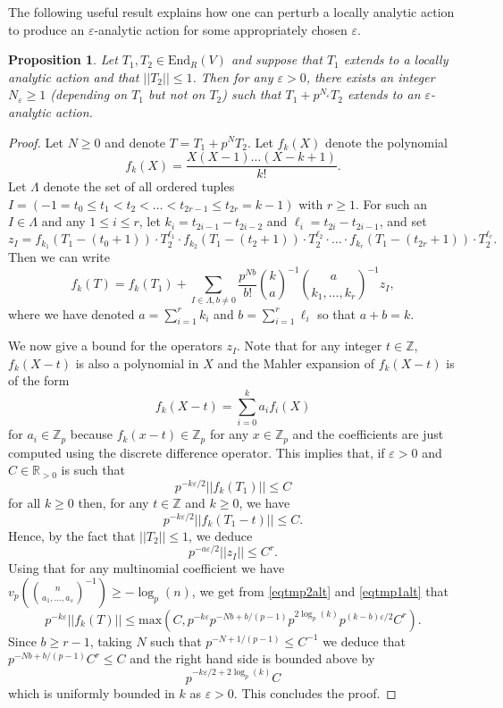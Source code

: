 \documentclass[10pt, oneside]{amsart}
\numberwithin{equation}{subsection}
\newtheorem{proposition}[equation]{Proposition}
\theoremstyle{definition}
\theoremstyle{remark}
\newcommand{\mbb}[1]{\mathbb{#1}}
\def\Z{{\mathbb{Z}}}
\def\zp{{\Z_p}}
\def\epsilon{\varepsilon}
\begin{document}
The following useful result explains how one can perturb a locally analytic action to produce an $\varepsilon$-analytic action for some appropriately chosen $\varepsilon$.

\begin{proposition} \label{Lemmaepsan1}
Let $T_1, T_2 \in \mathrm{End}_R(V)$ and suppose that $T_1$ extends to a locally analytic action and that $|\!|T_2|\!| \leq 1$. Then for any $\epsilon > 0$, there exists an integer $N_\epsilon \geq 1$ (depending on $T_1$ but not on $T_2$) such that $T_1 + p^{N_\epsilon} T_2$ extends to an $\epsilon$-analytic action.  
\end{proposition}

\begin{proof}
Let $N \geq 0$ and denote $T = T_1 + p^N T_2$. Let $f_k(X)$ denote the polynomial
\[ f_k(X) = \frac{X (X-1) \ldots (X - k + 1)}{k!}. \]
Let $\Lambda$ denote the set of all ordered tuples $I = (-1 = t_0 \leq t_1 < t_2 < \ldots < t_{2r-1} \leq t_{2r} = k-1)$ with $r \geq 1$. For such an $I \in \Lambda$ and any $1 \leq i \leq r$, let $k_i = t_{2i-1} - t_{2i-2}$ and $\ell_i = t_{2i} - t_{2i - 1}$, and set
 \[ z_I = f_{k_1}(T_1 - (t_0 + 1)) \cdot T_2^{\ell_1} \cdot f_{k_2}(T_1 - (t_2 + 1)) \cdot T_2^{\ell_2} \cdot \ldots \cdot f_{k_r}(T_1 - (t_{2r} + 1)) \cdot T_2^{\ell_r} .\]
Then we can write
\begin{equation} \label{eqtmp2alt}
f_k(T) = f_k(T_1) + \sum_{I \in \Lambda, b \neq 0} \frac{p^{N b}}{b!} \binom{k}{a}^{-1} \binom{a}{k_1, \ldots, k_r}^{-1} z_I,
\end{equation}
where we have denoted $a = \sum_{i=1}^r k_i$ and $b = \sum_{i=1}^r \ell_i$ so that $a + b = k$.

We now give a bound for the operators $z_I$. Note that for any integer $t \in \Z$, $f_k(X - t)$ is also a polynomial in $X$ and the Mahler expansion of $f_k(X - t)$ is of the form
\[ f_k(X - t) = \sum_{i = 0}^k a_i f_i(X) \] 
for $a_i \in \Z_p$ because $f_k(x - t) \in \zp$ for any $x \in \zp$ and the coefficients are just computed
using the discrete difference operator. This implies that, if $\epsilon > 0$ and $C \in \mbb{R}_{> 0}$ is such that
\[ p^{-k \epsilon / 2} |\!| f_k(T_1) |\!| \leq C \]
for all $k \geq 0$ then,
for any $t \in \Z$ and $k \geq 0$, we have
\[
p^{-k \epsilon / 2} |\!|f_k(T_1 - t)|\!| \leq C.
\]
Hence, by the fact that $|\!|T_2|\!| \leq 1$, we deduce
\begin{equation} \label{eqtmp1alt} p^{- a \epsilon / 2} |\!|z_I|\!| \leq C^{r}.
\end{equation}
Using that for any multinomial coefficient we have $v_p( \binom{n}{a_1, \ldots, a_s}^{-1} ) \geq - \log_p(n)$, we get from \eqref{eqtmp2alt} and \eqref{eqtmp1alt} that
\[ p^{-k \epsilon} |\!|f_k(T) |\!| \leq \mathrm{max}(C, p^{-k \epsilon} p^{-Nb + b/(p-1)} p^{2 \log_p(k)} p^{(k - b) \epsilon / 2} C^r ). \]
Since $b \geq r - 1$, taking $N$ such that $p^{-N + 1/(p-1)} \leq C^{-1}$ we deduce that $p^{-Nb + b/(p-1)} C^r \leq C$ and the right hand side is bounded above by
\[ p^{-k \epsilon / 2 + 2 \log_p(k)} C \]
which is uniformly bounded in $k$ as $\epsilon > 0$. This concludes the proof.
\end{proof}
\end{document}
